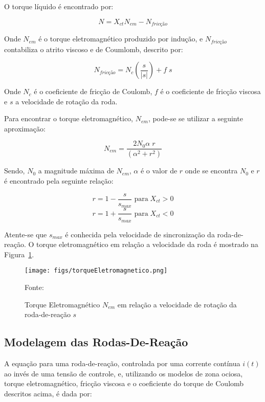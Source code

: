 O torque líquido é encontrado por:

\begin{equation}N=X_{ct}N_{em}-N_{fricção}\end{equation}

Onde $N_{em}$ é o torque eletromagnético produzido por indução, e $N_{fricção}$ contabiliza o atrito viscoso e de Coumlomb, descrito por:

\begin{equation}N_{fricção}=N_c\left (\frac{s}{|s|}\right )+f\;s\end{equation}

Onde $N_c$ é o coeficiente de fricção de Coulomb, $f$ é o coeficiente de fricção viscosa e $s$ a velocidade de rotação da roda.

Para encontrar o torque eletromagnético, $N_{em}$, pode-se se utilizar a seguinte aproximação:

\begin{equation} N_{em} = \frac{2N_0\alpha\;r}{(\alpha^2+r^2)}\end{equation}

Sendo, $N_0$ a magnitude máxima de $N_{em}$, $\alpha$ é o valor de $r$ onde se encontra $N_0$ e $r$ é encontrado pela seguinte relação:

\begin{equation}r=1-\frac{s}{s_{max}}\;\text{para}\;X_{ct}>0 \end{equation}\begin{equation} r=1+\frac{s}{s_{max}}\;\text{para}\;X_{ct}<0\end{equation}

Atente-se que $s_{max}$ é conhecida pela velocidade de sincronização da roda-de-reação. O torque eletromagnético em relação a velocidade da roda é mostrado na Figura~\ref{fig:15}.

\begin{figure}[htpb]
\centering
\texttt{[image: figs/torqueEletromagnetico.png]}
\caption{Torque Eletromagnético $N_{em}$ em relação a velocidade de rotação da roda-de-reação $s$}
{Fonte: \cite[p.~271]{wertz2012spacecraft}}
\label{fig:15}
\end{figure}

\subsection{Modelagem das Rodas-De-Reação}\label{sec:3.1.6.2}

A equação para uma roda-de-reação, controlada por uma corrente contínua $i(t)$ ao invés de uma tensão de controle, e, utilizando os modelos de zona ociosa,  torque eletromagnético, fricção viscosa e o coeficiente do torque de Coulomb descritos acima, é dada por:

